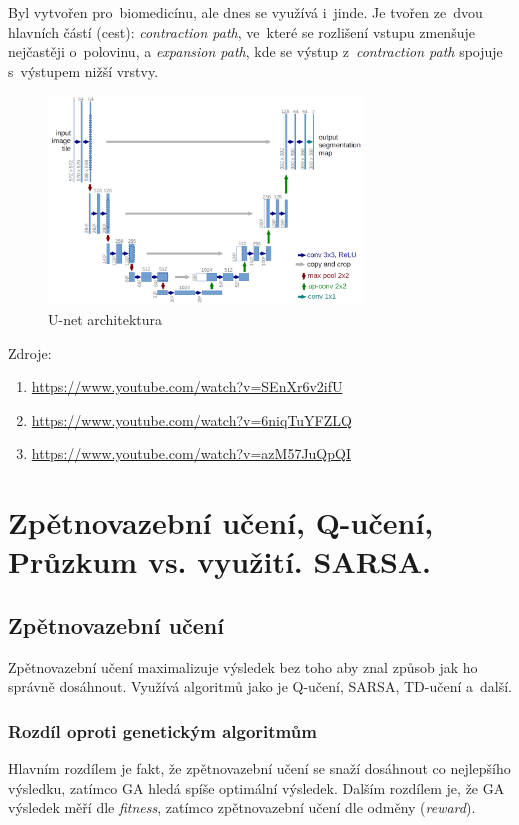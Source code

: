 Byl vytvořen pro~biomedicínu, ale dnes se využívá i~jinde.
Je tvořen ze~dvou hlavních částí (cest):
\emph{contraction path}, ve~které se rozlišení vstupu zmenšuje nejčastěji o~polovinu, a
\emph{expansion path}, kde se výstup z~\emph{contraction path} spojuje s~výstupem nižší vrstvy.

\begin{figure}[h]
    \centering
	\includegraphics[height=15em]{images/09_unet.png}
    \caption{U-net architektura}
    \label{LSTM}
\end{figure}

Zdroje:
\begin{enumerate}
    \item \url{https://www.youtube.com/watch?v=SEnXr6v2ifU}
    \item \url{https://www.youtube.com/watch?v=6niqTuYFZLQ}
    \item \url{https://www.youtube.com/watch?v=azM57JuQpQI}
\end{enumerate}


\clearpage
\section{Zpětnovazební učení, Q-učení, Průzkum vs. využití. SARSA.}

\subsection{Zpětnovazební učení}

Zpětnovazební učení maximalizuje výsledek bez toho aby znal způsob jak ho správně dosáhnout.
Využívá algoritmů jako je Q-učení, SARSA, TD-učení a~další.

\subsubsection{Rozdíl oproti genetickým algoritmům}

Hlavním rozdílem je fakt, že zpětnovazební učení se snaží dosáhnout co nejlepšího výsledku, zatímco GA hledá spíše optimální výsledek.
Dalším rozdílem je, že GA výsledek měří dle \emph{fitness}, zatímco zpětnovazební učení dle odměny (\emph{reward}).

